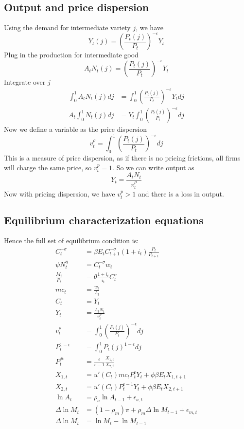 \documentclass[twocolumn, fleqn]{article}
\begin{document}
	\subsection{Output and price dispersion}
	Using the demand for intermediate variety $j$, we have 
	\[Y_t(j) = \left( \frac{P_t(j)}{P_t} \right)^{-\epsilon} Y_t\]
	Plug in the production for intermediate good 
	\[A_t N_t(j) = \left( \frac{P_t(j)}{P_t}\right)^{-\epsilon} Y_t\]
	Integrate over $j$
	\begin{align*}
		\int_0^1 A_t N_t(j) dj &= \int_0^1 \left( \frac{P_t(j)}{P_t} \right)^{-\epsilon} Y_t dj\\
		A_t \int_0^1 N_t(j) dj &= Y_t \int_0^1 \left( \frac{P_t(j)}{P_t} \right)^{-\epsilon} dj
	\end{align*}
	Now we define a variable as the price dispersion
	\begin{equation}
		v_t^{\rho} = \int_0^1 \left( \frac{P_t(j)}{P_t} \right)^{-\epsilon} dj
	\end{equation}
	This is a measure of price dispersion, as if there is no pricing frictions, all firms will charge the same price, so $v_t^p =1$.
	So we can write output as 
	\begin{equation}
		Y_t = \frac{A_t N_t}{v_t^{\rho}}
	\end{equation}
	Now with pricing dispersion, we have $v_t^p >1$ and there is a loss in output.
	
	\subsection{Equilibrium characterization equations}
	Hence the full set of equilibrium condition is:
	\begin{align}
	C_t^{-\sigma} &= \beta E_t C_{t+1}^{-\sigma} (1 + i_t) \frac{P_t}{P_{t+1}} \\
	\psi N_t^\eta &= C_t^{-\sigma} w_t \\
	\frac{M_t}{P_t} &= \theta \frac{1 + i_t}{i_t} C_t^\sigma \\
	mc_t &= \frac{w_t}{A_t} \\
	C_t &= Y_t \\
	Y_t &= \frac{A_t N_t}{v_t^\rho} \\
	v_t^\rho &= \int_0^1 \left( \frac{P_t(j)}{P_t} \right)^{-\epsilon} dj \\
	P_t^{1-\epsilon} &= \int_0^1 P_t(j)^{1-\epsilon} dj \\
	P_t^{\#} &= \frac{\epsilon}{\epsilon - 1} \frac{X_{1,t}}{X_{2,t}} \\
	X_{1,t} &= u'(C_t) mc_t P_t^\epsilon Y_t + \phi \beta E_t X_{1,t+1} \\
	X_{2,t} &= u'(C_t) P_t^{\epsilon-1} Y_t + \phi \beta E_t X_{2,t+1} \\
	\ln A_t &= \rho_a \ln A_{t-1} + \epsilon_{a,t} \\
	\Delta \ln M_t &= (1 - \rho_m) \pi + \rho_m \Delta \ln M_{t-1} + \epsilon_{m,t} \\
	\Delta \ln M_t &= \ln M_t - \ln M_{t-1}
	\end{align}
	
\end{document}
